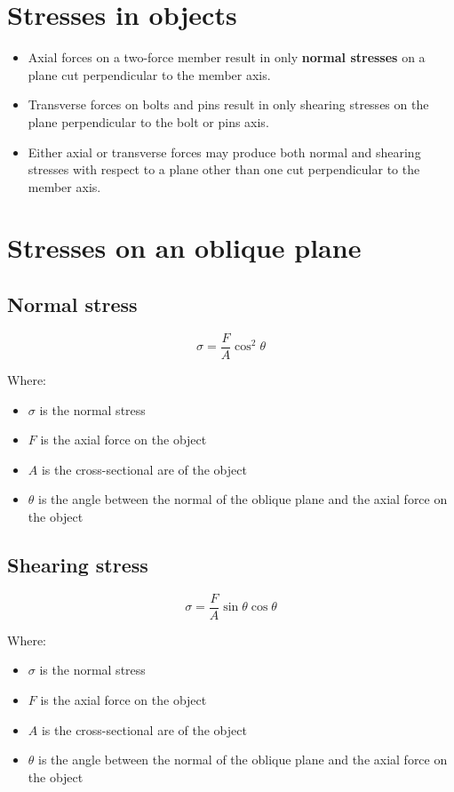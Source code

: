 \documentclass[11pt]{article}
\begin{document}
\section{Stresses in objects}
\label{sec:orgc8dbf29}
\begin{itemize}
\item Axial forces on a two-force member result in only \textbf{normal stresses} on a plane cut perpendicular to the member axis.
\item Transverse forces on bolts and pins result in only shearing stresses on the plane perpendicular to the bolt or pins axis.
\item Either axial or transverse forces may produce both normal and shearing stresses with respect to a plane other than one cut perpendicular to the member axis.
\end{itemize}
\section{Stresses on an oblique plane}
\label{sec:org9898ede}

\subsection{Normal stress}
\label{sec:orgbf52607}
\[\sigma = \frac{F}{A} \cos^2 \theta\]

Where:
\begin{itemize}
\item \(\sigma\) is the normal stress
\item \(F\) is the axial force on the object
\item \(A\) is the cross-sectional are of the object
\item \(\theta\) is the angle between the normal of the oblique plane and the axial force on the object
\end{itemize}
\subsection{Shearing stress}
\label{sec:org0c5fc45}
\[\sigma = \frac{F}{A} \sin \theta \cos \theta\]

Where:
\begin{itemize}
\item \(\sigma\) is the normal stress
\item \(F\) is the axial force on the object
\item \(A\) is the cross-sectional are of the object
\item \(\theta\) is the angle between the normal of the oblique plane and the axial force on the object
\end{itemize}
\end{document}
